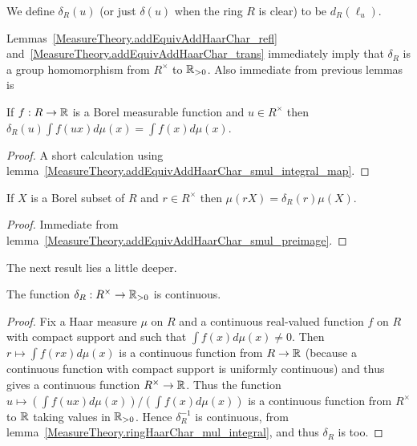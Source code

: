 \begin{definition}
  \label{MeasureTheory.ringHaarChar}
  \leanok
  We define $\delta_R(u)$ (or just $\delta(u)$ when the ring $R$ is clear) to be $d_R(\ell_u)$.
\end{definition}

Lemmas~\ref{MeasureTheory.addEquivAddHaarChar_refl}
and~\ref{MeasureTheory.addEquivAddHaarChar_trans} immediately imply that $\delta_R$ is a group
homomorphism from $R^\times$ to $\mathbb{R}_{>0}$.
Also immediate from previous lemmas is

\begin{lemma}
  \label{MeasureTheory.ringHaarChar_mul_integral}
  \leanok
  If $f:R\to\mathbb{R}$ is a Borel measurable function and $u\in R^\times$ then
  $\delta_R(u)\int f(ux)d\mu(x)=\int f(x)d\mu(x)$.
\end{lemma}
\begin{proof}
  \leanok
  A short calculation using lemma~\ref{MeasureTheory.addEquivAddHaarChar_smul_integral_map}.
\end{proof}

\begin{lemma}
  \label{MeasureTheory.ringHaarChar_mul_volume}
  \leanok
  If $X$ is a Borel subset of $R$ and $r\in R^\times$ then $\mu(rX)=\delta_R(r)\mu(X)$.
\end{lemma}
\begin{proof}
  \leanok
   Immediate from lemma~\ref{MeasureTheory.addEquivAddHaarChar_smul_preimage}.
\end{proof}

The next result lies a little deeper.

\begin{corollary}
  \label{MeasureTheory.ringHaarChar_continuous}
  \leanok
  The function $\delta_R:R^\times\to\mathbb{R}_{>0}$ is continuous.
\end{corollary}
\begin{proof}
  \leanok
  Fix a Haar measure $\mu$ on $R$ and a continuous real-valued function
  $f$ on $R$ with compact support and such that $\int f(x) d\mu(x)\not=0$.
  Then $r \mapsto \int f(rx) d\mu(x)$ is a continuous function
  from $R\to\mathbb{R}$ (because a continuous function with compact support is uniformly
   continuous) and thus gives a continuous function $R^\times\to\mathbb{R}$.
   Thus the function $u\mapsto (\int f(ux) d\mu(x))/(\int f(x)d\mu(x))$ is
   a continuous function from $R^\times$ to $\mathbb{R}$ taking values in $\mathbb{R}_{>0}$.
   Hence $\delta_R^{-1}$ is continuous,
   from lemma~\ref{MeasureTheory.ringHaarChar_mul_integral},
   and thus $\delta_R$ is too.
\end{proof}

